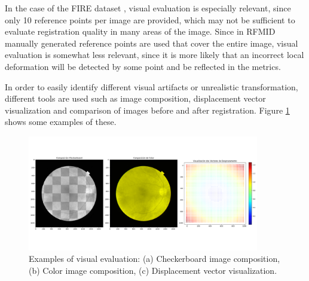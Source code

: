 In the case of the FIRE dataset \cite{FIRE}, visual evaluation is especially relevant, since only 10 reference points per image are provided, which may not be sufficient to evaluate registration quality in many areas of the image.
Since in RFMID \cite{RFMiD} manually generated reference points are used that cover the entire image, visual evaluation is somewhat less relevant, since it is more likely that an incorrect local deformation will be detected by some point and be reflected in the metrics.

In order to easily identify different visual artifacts or unrealistic transformation, different tools are used such as image composition, displacement vector visualization and comparison of images before and after registration.
Figure \ref{fig:visex} shows some examples of these.

\begin{figure}[tbp]
    \centering
    \includegraphics[width=0.9\textwidth]{imaxes/visex.png}
    \caption{Examples of visual evaluation: (a) Checkerboard image composition, (b) Color image composition, (c) Displacement vector visualization.}
    \label{fig:visex}
\end{figure}